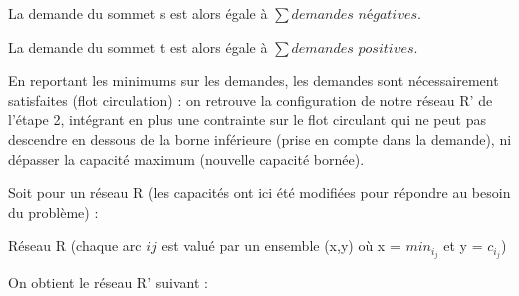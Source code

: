 \documentclass[letterpaper,12pt]{article}
\begin{document}
La demande du sommet s est alors égale à $\sum demandes$ $négatives$.

La demande du sommet t est alors égale à $\sum demandes$ $positives$.

En reportant les minimums sur les demandes, les demandes sont nécessairement satisfaites (flot circulation) : on retrouve la configuration de notre réseau R' de l'étape 2, intégrant en plus une contrainte sur le flot circulant qui ne peut pas descendre en dessous de la borne inférieure (prise en compte dans la demande), ni dépasser la capacité maximum (nouvelle capacité bornée).

Soit pour un réseau R (les capacités ont ici été modifiées pour répondre au besoin du problème) :

\begin{center}

Réseau R (chaque arc $ij$ est valué par un ensemble (x,y) où x = $min_i_j$ et y = $c_i_j$)
\end{center}
\hfill \break
On obtient le réseau R' suivant :
\end{document}
